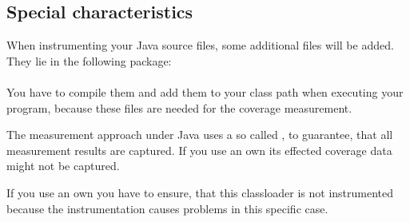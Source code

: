 \subsection{Special characteristics}
When instrumenting your Java source files, some additional files will be added. They lie in the following package: \\
 \\
You have to compile them and add them to your class path when executing your program, because these files are needed for the coverage measurement.
\par
The measurement approach under Java uses a so called , to guarantee, that all measurement results are captured. If you use an own  its effected coverage data might not be captured.
\par
If you use an own  you have to ensure, that this classloader is not instrumented because the instrumentation causes problems in this specific case.
